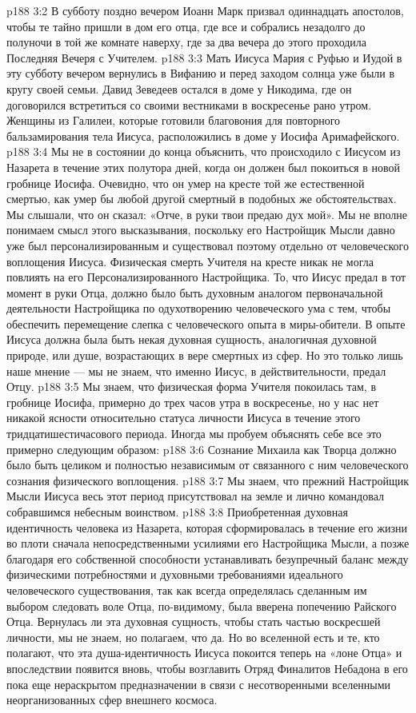 \vs p188 3:2 В субботу поздно вечером Иоанн Марк призвал одиннадцать апостолов, чтобы те тайно пришли в дом его отца, где все и собрались незадолго до полуночи в той же комнате наверху, где за два вечера до этого проходила Последняя Вечеря с Учителем.
\vs p188 3:3 Мать Иисуса Мария с Руфью и Иудой в эту субботу вечером вернулись в Вифанию и перед заходом солнца уже были в кругу своей семьи. Давид Зеведеев остался в доме у Никодима, где он договорился встретиться со своими вестниками в воскресенье рано утром. Женщины из Галилеи, которые готовили благовония для повторного бальзамирования тела Иисуса, расположились в доме у Иосифа Аримафейского.
\vs p188 3:4 \pc Мы не в состоянии до конца объяснить, что происходило с Иисусом из Назарета в течение этих полутора дней, когда он должен был покоиться в новой гробнице Иосифа. Очевидно, что он умер на кресте той же естественной смертью, как умер бы любой другой смертный в подобных же обстоятельствах. Мы слышали, что он сказал: «Отче, в руки твои предаю дух мой». Мы не вполне понимаем смысл этого высказывания, поскольку его Настройщик Мысли давно уже был персонализированным и существовал поэтому отдельно от человеческого воплощения Иисуса. Физическая смерть Учителя на кресте никак не могла повлиять на его Персонализированного Настройщика. То, что Иисус предал в тот момент в руки Отца, должно было быть духовным аналогом первоначальной деятельности Настройщика по одухотворению человеческого ума с тем, чтобы обеспечить перемещение слепка с человеческого опыта в миры\hyp{}обители. В опыте Иисуса должна была быть некая духовная сущность, аналогичная духовной природе, или душе, возрастающих в вере смертных из сфер. Но это только лишь наше мнение --- мы не знаем, что именно Иисус, в действительности, предал Отцу.
\vs p188 3:5 Мы знаем, что физическая форма Учителя покоилась там, в гробнице Иосифа, примерно до трех часов утра в воскресенье, но у нас нет никакой ясности относительно статуса личности Иисуса в течение этого тридцатишестичасового периода. Иногда мы пробуем объяснять себе все это примерно следующим образом:
\vs p188 3:6 \bibnobreakspace Сознание Михаила как Творца должно было быть целиком и полностью независимым от связанного с ним человеческого сознания физического воплощения.
\vs p188 3:7 \bibnobreakspace Мы знаем, что прежний Настройщик Мысли Иисуса весь этот период присутствовал на земле и лично командовал собравшимся небесным воинством.
\vs p188 3:8 \bibnobreakspace Приобретенная духовная идентичность человека из Назарета, которая сформировалась в течение его жизни во плоти сначала непосредственными усилиями его Настройщика Мысли, а позже благодаря его собственной способности устанавливать безупречный баланс между физическими потребностями и духовными требованиями идеального человеческого существования, так как всегда определялась сделанным им выбором следовать воле Отца, по\hyp{}видимому, была вверена попечению Райского Отца. Вернулась ли эта духовная сущность, чтобы стать частью воскресшей личности, мы не знаем, но полагаем, что да. Но во вселенной есть и те, кто полагают, что эта душа\hyp{}идентичность Иисуса покоится теперь на «лоне Отца» и впоследствии появится вновь, чтобы возглавить Отряд Финалитов Небадона в его пока еще нераскрытом предназначении в связи с несотворенными вселенными неорганизованных сфер внешнего космоса.
